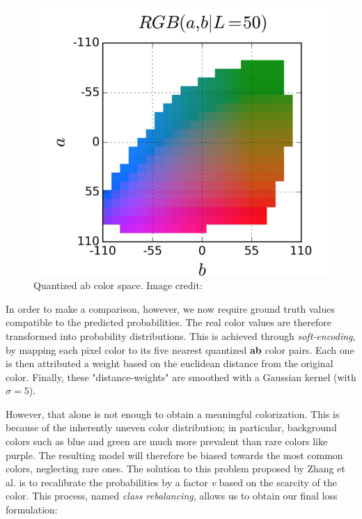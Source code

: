 \documentclass[twoside,twocolumn]{article}
\begin{document}
\begin{figure} [h]
	\includegraphics[width=\linewidth]{img/quantized.png}
	\caption{Quantized ab color space. Image credit:\cite{Zhang:2016}}
	\label{fig:quantized}
\end{figure}


In order to make a comparison, however, we now require ground truth values compatible to the predicted probabilities. The real color values are therefore transformed into probability distributions. This is achieved through \textit{soft-encoding}, by mapping each pixel color to its five nearest quantized \textbf{ab} color pairs. Each one is then attributed a weight based on the euclidean distance from the original color. Finally, these "distance-weights" are smoothed with a Gaussian kernel (with $\sigma=5$)\cite{Geoffrey:2015}.

However, that alone is not enough to obtain a meaningful colorization. This is because of the inherently uneven color distribution; in particular, background colors such as blue and green are much more prevalent than rare colors like purple. The resulting model will therefore be biased towards the most common colors, neglecting rare ones. 
The solution to this problem proposed by Zhang et al. \cite{Zhang:2016} is to recalibrate the probabilities by a factor \textit{v} based on the scarcity of the color. This process, named \textit{class rebalancing}, allows us to obtain our final loss formulation:
\end{document}
